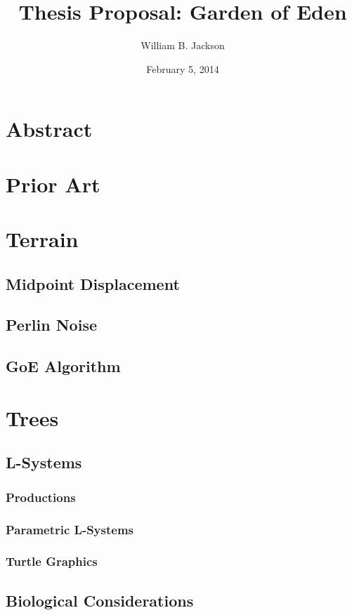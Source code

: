 \documentclass{article}
\title{Thesis Proposal: Garden of Eden}
\author{William B. Jackson}
\date{February 5, 2014}
\begin{document}
    \maketitle
    \section{Abstract}

    \section{Prior Art}

    \section{Terrain}
        \subsection{Midpoint Displacement}

        \subsection{Perlin Noise}

        \subsection{GoE Algorithm}

    \section{Trees}
        \subsection{L-Systems}
            \subsubsection{Productions}
            \subsubsection{Parametric L-Systems}
            \subsubsection{Turtle Graphics}

        \subsection{Biological Considerations}
\end{document}
